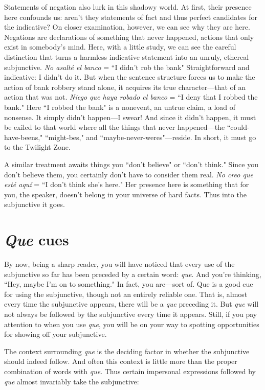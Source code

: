 Statements of negation also lurk in this shadowy world. At
first, their presence here confounds us: aren't they statements of fact
and thus perfect candidates for the indicative? On closer examination,
however, we can see why they are here. Negations are declarations of
something that never happened, actions that only exist in somebody's
mind. Here, with a little study, we can see the careful distinction that
turns a harmless indicative statement into an unruly, ethereal subjunctive. \emph{No asalté el banco} = ``I didn't rob the bank" Straightforward and
indicative: I didn't do it. But when the sentence structure forces us to
make the action of bank robbery stand alone, it acquires its true character---that of an action that was not. \emph{Niego que haya robado el banco}
= ``I deny that I robbed the bank." Here ``I robbed the bank" is a nonevent, an untrue claim, a load of nonsense. It simply didn't happen---I swear! And since it didn't happen, it must be exiled to that world
where all the things that never happened---the ``could-have-beens,"
``might-bes," and ``maybe-never-weres"---reside. In short, it must go
to the Twilight Zone.

A similar treatment awaits things you ``don't believe" or
``don't think." Since you don't believe them, you certainly don't have
to consider them real. \emph{No creo que esté aquí} = ``I don't think she's
here." Her presence here is something that for you, the speaker,
doesn't belong in your universe of hard facts. Thus into the subjunctive
it goes.

\section{\emph{Que} cues}

By now, being a sharp reader, you will have noticed that every
use of the subjunctive so far has been preceded by a certain word: \emph{que}.
And you're thinking, ``Hey, maybe I'm on to something." In fact, you
are---sort of. Que is a good cue for using the subjunctive, though not
an entirely reliable one. That is, almost every time the subjunctive
appears, there will be a \emph{que} preceding it. But \emph{que} will not always be
followed by the subjunctive every time it appears. Still, if you pay
attention to when you use \emph{que}, you will be on your way to spotting
opportunities for showing off your subjunctive.

The context surrounding \emph{que} is the deciding factor in whether
the subjunctive should indeed follow. And often this context is little
more than the proper combination of words with \emph{que}. Thus certain
impersonal expressions followed by \emph{que} almost invariably take the
subjunctive:

